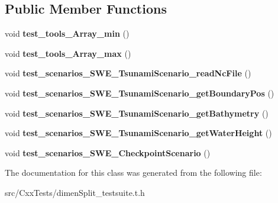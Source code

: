 \subsection*{Public Member Functions}
\begin{DoxyCompactItemize}
\item 
\hypertarget{classDimenSplitTest_a3fbf9c280085bbfff54a2299869d60ae}{void {\bfseries test\-\_\-tools\-\_\-\-Array\-\_\-min} ()}\label{classDimenSplitTest_a3fbf9c280085bbfff54a2299869d60ae}

\item 
\hypertarget{classDimenSplitTest_a5356c1e7bec04a5c85fc928d63a1e07d}{void {\bfseries test\-\_\-tools\-\_\-\-Array\-\_\-max} ()}\label{classDimenSplitTest_a5356c1e7bec04a5c85fc928d63a1e07d}

\item 
\hypertarget{classDimenSplitTest_aa47917e90bf5dbdb8245805c662d222a}{void {\bfseries test\-\_\-scenarios\-\_\-\-S\-W\-E\-\_\-\-Tsunami\-Scenario\-\_\-read\-Nc\-File} ()}\label{classDimenSplitTest_aa47917e90bf5dbdb8245805c662d222a}

\item 
\hypertarget{classDimenSplitTest_a8b96e672db959d66714fa8104d898223}{void {\bfseries test\-\_\-scenarios\-\_\-\-S\-W\-E\-\_\-\-Tsunami\-Scenario\-\_\-get\-Boundary\-Pos} ()}\label{classDimenSplitTest_a8b96e672db959d66714fa8104d898223}

\item 
\hypertarget{classDimenSplitTest_ac8bd774189339bfd83fe87c21c17c377}{void {\bfseries test\-\_\-scenarios\-\_\-\-S\-W\-E\-\_\-\-Tsunami\-Scenario\-\_\-get\-Bathymetry} ()}\label{classDimenSplitTest_ac8bd774189339bfd83fe87c21c17c377}

\item 
\hypertarget{classDimenSplitTest_a025c0c3b8cad8d628051c8c6bbc48d4d}{void {\bfseries test\-\_\-scenarios\-\_\-\-S\-W\-E\-\_\-\-Tsunami\-Scenario\-\_\-get\-Water\-Height} ()}\label{classDimenSplitTest_a025c0c3b8cad8d628051c8c6bbc48d4d}

\item 
\hypertarget{classDimenSplitTest_a9c2eb796a6d0fe80217c636f6abb2b64}{void {\bfseries test\-\_\-scenarios\-\_\-\-S\-W\-E\-\_\-\-Checkpoint\-Scenario} ()}\label{classDimenSplitTest_a9c2eb796a6d0fe80217c636f6abb2b64}

\end{DoxyCompactItemize}


The documentation for this class was generated from the following file\-:\begin{DoxyCompactItemize}
\item 
src/\-Cxx\-Tests/dimen\-Split\-\_\-testsuite.\-t.\-h\end{DoxyCompactItemize}
